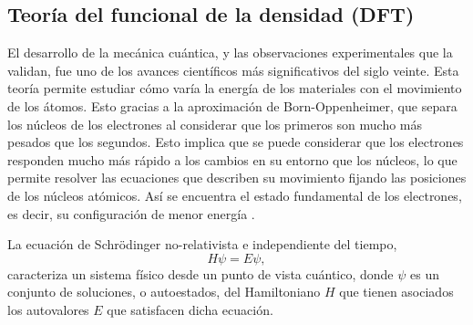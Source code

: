\subsection{Teoría del funcional de la densidad (DFT)}

El desarrollo de la mecánica cuántica, y las observaciones experimentales que la
validan, fue uno de los avances científicos más significativos del siglo veinte. 
Esta teoría permite estudiar cómo varía la energía de los materiales con el 
movimiento de los átomos. Esto gracias a la aproximación de Born-Oppenheimer, que 
separa los núcleos de los electrones al considerar que los primeros son mucho más
pesados que los segundos. Esto implica que se puede considerar que los electrones 
responden mucho más rápido a los cambios en su entorno que los núcleos, lo que 
permite resolver las ecuaciones que describen su movimiento fijando las 
posiciones de los núcleos atómicos. Así se encuentra el estado fundamental de los
electrones, es decir, su configuración de menor energía \cite{shankar2012}.

La ecuación de Schrödinger no-relativista e independiente del tiempo,
\begin{equation}\label{eq:schrodinger}
    H \psi = E \psi,
\end{equation}
caracteriza un sistema físico desde un punto de vista cuántico, donde $\psi$ es un
conjunto de soluciones, o autoestados, del Hamiltoniano $H$ que tienen asociados los
autovalores $E$ que satisfacen dicha ecuación. 

